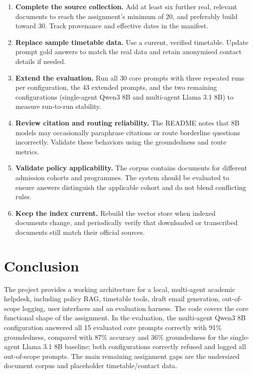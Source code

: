 \documentclass[11pt,a4paper]{article}
\begin{document}
\begin{enumerate}
  \item \textbf{Complete the source collection.} Add at least six further real, relevant documents to reach the assignment's minimum of 20, and preferably build toward 30. Track provenance and effective dates in the manifest.
  \item \textbf{Replace sample timetable data.} Use a current, verified timetable. Update prompt gold answers to match the real data and retain anonymised contact details if needed.
  \item \textbf{Extend the evaluation.} Run all 30 core prompts with three repeated runs per configuration, the 43 extended prompts, and the two remaining configurations (single-agent Qwen3 8B and multi-agent Llama 3.1 8B) to measure run-to-run stability.
  \item \textbf{Review citation and routing reliability.} The README notes that 8B models may occasionally paraphrase citations or route borderline questions incorrectly. Validate these behaviors using the groundedness and route metrics.
  \item \textbf{Validate policy applicability.} The corpus contains documents for different admission cohorts and programmes. The system should be evaluated to ensure answers distinguish the applicable cohort and do not blend conflicting rules.
  \item \textbf{Keep the index current.} Rebuild the vector store when indexed documents change, and periodically verify that downloaded or transcribed documents still match their official sources.
\end{enumerate}

\section{Conclusion}

The project provides a working architecture for a local, multi-agent academic helpdesk, including policy RAG, timetable tools, draft email generation, out-of-scope logging, user interfaces and an evaluation harness. The code covers the core functional shape of the assignment. In the evaluation, the multi-agent Qwen3 8B configuration answered all 15 evaluated core prompts correctly with 91\% groundedness, compared with 87\% accuracy and 36\% groundedness for the single-agent Llama 3.1 8B baseline; both configurations correctly refused and logged all out-of-scope prompts. The main remaining assignment gaps are the undersized document corpus and placeholder timetable/contact data.
\end{document}
